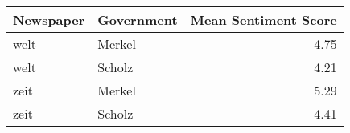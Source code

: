 \begin{table}[ht]
\centering
\begin{tabular}{llr}
  \hline
Newspaper & Government & Mean Sentiment Score \\ 
  \hline
welt & Merkel & 4.75 \\ 
  welt & Scholz & 4.21 \\ 
  zeit & Merkel & 5.29 \\ 
  zeit & Scholz & 4.41 \\ 
   \hline
\end{tabular}
\end{table}
